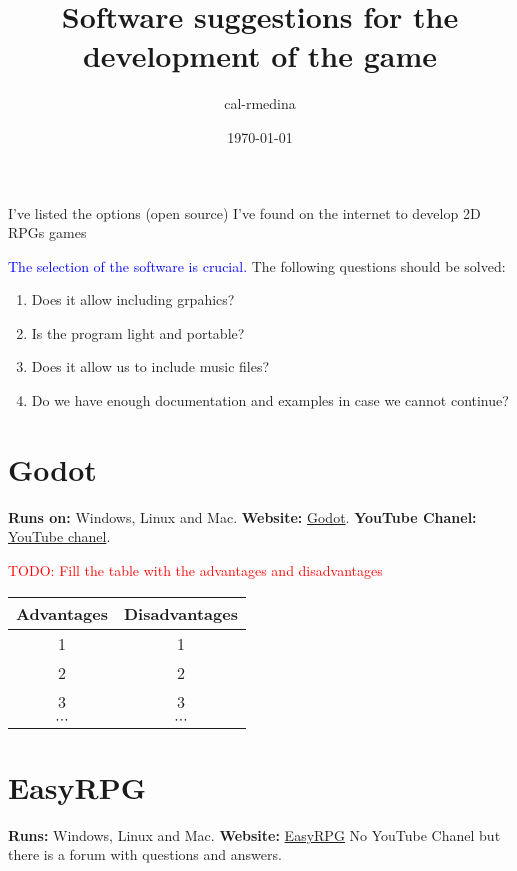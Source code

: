 \documentclass{article}
\title{Software suggestions for the development of the game}
\date{\today}
\author{cal-rmedina}
\begin{document}
  \maketitle

I've listed the options (open source) I've found on the internet to develop 2D RPGs games

\textcolor{blue}{The selection of the software is crucial.} The following questions should be solved:

\begin{enumerate}
  \item Does it allow including grpahics?
  \item Is the program light and portable?
  \item Does it allow us to include music files?
  \item Do we have enough documentation and examples in case we cannot continue?
\end{enumerate}

\section{Godot}

\textbf{Runs on:} Windows, Linux and Mac.
\textbf{Website:} \href{https://godotengine.org/}{Godot}.
\textbf{YouTube Chanel:} \href{https://www.youtube.com/@GodotEngineOfficial/featured}{YouTube chanel}.

\textcolor{red}{TODO: Fill the table with the advantages and disadvantages} 

\begin{center}
\begin{tabular}{ |c|c| } 
  \hline
  Advantages & Disadvantages\\ 
  \hline
  1 & 1\\ 
  \hline
  2 & 2\\
  \hline
  3 & 3\\
  \hline
  $\cdots$ & $\cdots$\\
  \hline
\end{tabular}
\end{center}

\section{EasyRPG}

\textbf{Runs:} Windows, Linux and Mac.
\textbf{Website:} \href{https://easyrpg.org/}{EasyRPG}
No YouTube Chanel but there is a forum with questions and answers.
\end{document}
